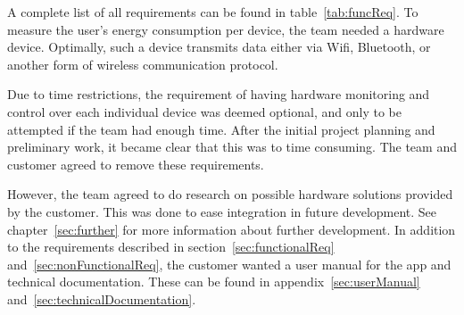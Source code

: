 A complete list of all requirements can be found in table~\ref{tab:funcReq}.
\noindent To measure the user's energy consumption per device, the team needed a hardware device. Optimally, such a device transmits  data either via Wifi, Bluetooth, or another form of wireless communication protocol.

Due to time restrictions, the requirement of having hardware monitoring and control over each individual device was deemed optional, and only to be attempted if the team had enough time. After the initial project planning and preliminary work, it became clear that this was to time consuming. The team and customer agreed to remove these requirements. 

However, the team agreed to do research on possible hardware solutions provided by the customer. This was done to ease integration in future development. See chapter~\ref{sec:further} for more information about further development. In addition to the requirements described in section~\ref{sec:functionalReq} and~\ref{sec:nonFunctionalReq}, the customer wanted a user manual for the app and technical documentation. These can be found in appendix~\ref{sec:userManual} and~\ref{sec:technicalDocumentation}.
